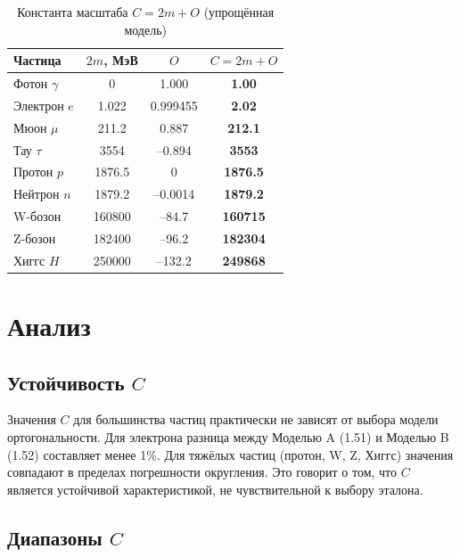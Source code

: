 \documentclass[12pt,a4paper]{article}
\begin{document}
\begin{table}[h]
    \centering
    \caption{Константа масштаба $C = 2m + O$ (упрощённая модель)}
    \begin{tabular}{lccc}
        \toprule
        Частица & $2m$, МэВ & $O$ & $C = 2m + O$ \\
        \midrule
        Фотон $\gamma$ & 0 & 1.000 & \textbf{1.00} \\
        Электрон $e$ & 1.022 & 0.999455 & \textbf{2.02} \\
        Мюон $\mu$ & 211.2 & 0.887 & \textbf{212.1} \\
        Тау $\tau$ & 3554 & --0.894 & \textbf{3553} \\
        Протон $p$ & 1876.5 & 0 & \textbf{1876.5} \\
        Нейтрон $n$ & 1879.2 & --0.0014 & \textbf{1879.2} \\
        W-бозон & 160800 & --84.7 & \textbf{160715} \\
        Z-бозон & 182400 & --96.2 & \textbf{182304} \\
        Хиггс $H$ & 250000 & --132.2 & \textbf{249868} \\
        \bottomrule
    \end{tabular}
    \label{tab:modelC}
\end{table}

\section{Анализ}

\subsection{Устойчивость $C$}

Значения $C$ для большинства частиц практически не зависят от выбора модели ортогональности. Для электрона разница между Моделью A (1.51) и Моделью B (1.52) составляет менее 1\%. Для тяжёлых частиц (протон, W, Z, Хиггс) значения совпадают в пределах погрешности округления. Это говорит о том, что $C$ является устойчивой характеристикой, не чувствительной к выбору эталона.

\subsection{Диапазоны $C$}
\end{document}
